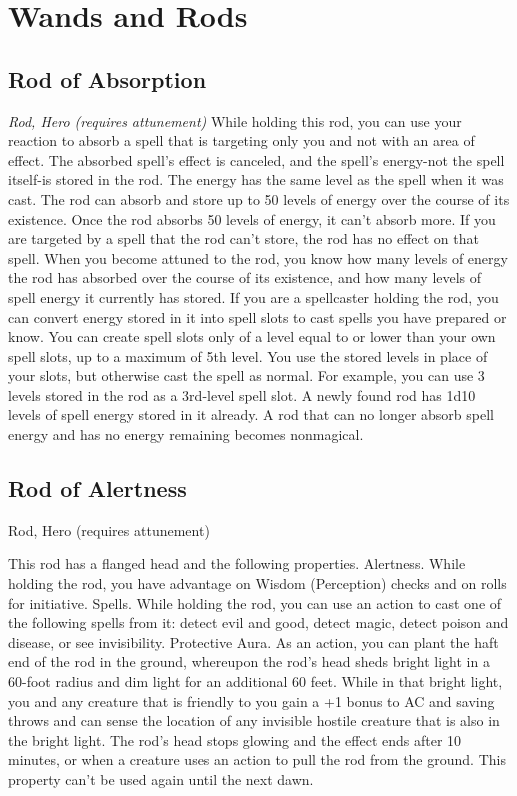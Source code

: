 \section{Wands and Rods}\label{mi:wands}

\subsection{Rod of Absorption}
\textit{Rod, Hero (requires attunement)}
While holding this rod, you can use your reaction to absorb a spell that is targeting only you and not with an area of effect. The absorbed spell's effect is canceled, and the spell's energy-not the spell itself-is stored in the rod. The energy has the same level as the spell when it was cast. The rod can absorb and store up to 50 levels of energy over the course of its existence. Once the rod absorbs 50 levels of energy, it can't absorb more. If you are targeted by a spell that the rod can't store, the rod has no effect on that spell.
When you become attuned to the rod, you know how many levels of energy the rod has absorbed over the course of its existence, and how many levels of spell energy it currently has stored.
If you are a spellcaster holding the rod, you can convert energy stored in it into spell slots to cast spells you have prepared or know. You can create spell slots only of a level equal to or lower than your own spell slots, up to a maximum of 5th level. You use the stored levels in place of your slots, but otherwise cast the spell as normal. For example, you can use 3 levels stored in the rod as a 3rd-level spell slot.
A newly found rod has 1d10 levels of spell energy stored in it already. A rod that can no longer absorb spell energy and has no energy remaining becomes nonmagical.

\subsection{Rod of Alertness}
Rod, Hero (requires attunement) 

This rod has a flanged head and the following properties.
Alertness. While holding the rod, you have advantage on Wisdom (Perception) checks and on rolls for initiative.
Spells. While holding the rod, you can use an action to cast one of the following spells from it: detect evil and good, detect magic, detect poison and disease, or see invisibility.
Protective Aura. As an action, you can plant the haft end of the rod in the ground, whereupon the rod's head sheds bright light in a 60-foot radius and dim light for an additional 60 feet. While in that bright light, you and any creature that is friendly to you gain a +1 bonus to AC and saving throws and can sense the location of any invisible hostile creature that is also in the bright light.  The rod's head stops glowing and the effect ends after 10 minutes, or when a creature uses an action to pull the rod from the ground. This property can't be used again until the next dawn.

